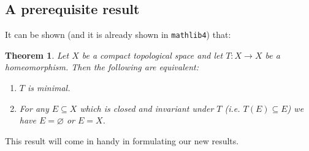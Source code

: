 \documentclass[11pt]{article}
\newtheorem{theorem}{Theorem}[section]
\theoremstyle{definition}              %
\theoremstyle{definition}              %
\theoremstyle{definition}              %
\begin{document}
\subsection{A prerequisite result}
It can be shown (and it is already shown in \verb|mathlib4|) that:
\begin{theorem}\label{thm1}
    Let $X$ be a compact topological space and let $T: X \to X$ be a homeomorphism. Then the following are equivalent:
    \begin{enumerate}
        \item [(a)] $T$ is minimal.
        \item [(b)] For any $E \subseteq X$ which is closed and  invariant under $T$ (i.e. $T(E) \subseteq E$) we have $E = \varnothing$ or $E=X$.
    \end{enumerate}
\end{theorem}

\begin{comment}
A proof can be found in the lecture notes by Ceglie (see \citep[Prop.~1.13,p.~13]{ceglie}). This was implemented in Mathlib 4 by Kudryashov as follows \citep{kudry}:

\begin{lstlisting}
class MulAction.IsMinimal (M α : Type*) [Monoid M] [TopologicalSpace α] [MulAction M α] :
    Prop where
  dense_orbit : ∀ x : α, Dense (MulAction.orbit M x)
  
theorem isMinimal_iff_isClosed_smul_invariant (M G : Type*) {α : Type*} [Monoid M] [Group G] [TopologicalSpace α] [MulAction M α]
  [MulAction G α] [ContinuousConstSMul M α] :
    IsMinimal M α ↔ ∀ s : Set α, IsClosed s → (∀ c : M, c • s ⊆ s) → s = ∅ ∨ s = univ
\end{lstlisting}

Notice that this version of the theorem is written in a much more general way and writing the action as a multiplicative action as opposed to an additive action.
\end{comment}

This result will come in handy in formulating our new results.
\end{document}
